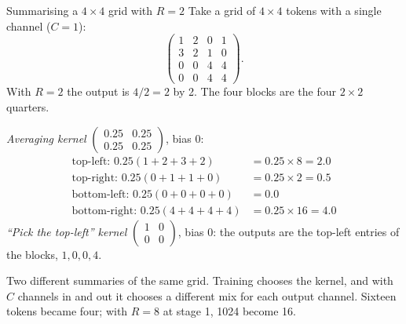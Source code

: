 \begin{worked}[label={we:esa:toyconv}]{Summarising a $4\times4$ grid with $R = 2$}
Take a grid of $4\times4$ tokens with a single channel ($C = 1$):
\[
  \begin{pmatrix} 1 & 2 & 0 & 1\\ 3 & 2 & 1 & 0\\ 0 & 0 & 4 & 4\\ 0 & 0 & 4 & 4 \end{pmatrix}.
\]
With $R = 2$ the output is $4/2 = 2$ by 2. The four blocks are the four $2\times2$ quarters.

\emph{Averaging kernel} $\begin{pmatrix}0.25 & 0.25\\ 0.25 & 0.25\end{pmatrix}$, bias 0:
\begin{align*}
  \text{top-left: } 0.25(1 + 2 + 3 + 2) &= 0.25\times8 = 2.0\\
  \text{top-right: } 0.25(0 + 1 + 1 + 0) &= 0.25\times2 = 0.5\\
  \text{bottom-left: } 0.25(0 + 0 + 0 + 0) &= 0.0\\
  \text{bottom-right: } 0.25(4 + 4 + 4 + 4) &= 0.25\times16 = 4.0
\end{align*}
\emph{``Pick the top-left'' kernel} $\begin{pmatrix}1 & 0\\ 0 & 0\end{pmatrix}$, bias 0: the outputs
are the top-left entries of the blocks, $1, 0, 0, 4$.

Two different summaries of the same grid. Training chooses the kernel, and with $C$ channels in
and out it chooses a different mix for each output channel. Sixteen tokens became four; with
$R = 8$ at stage 1, 1024 become 16.
\end{worked}

